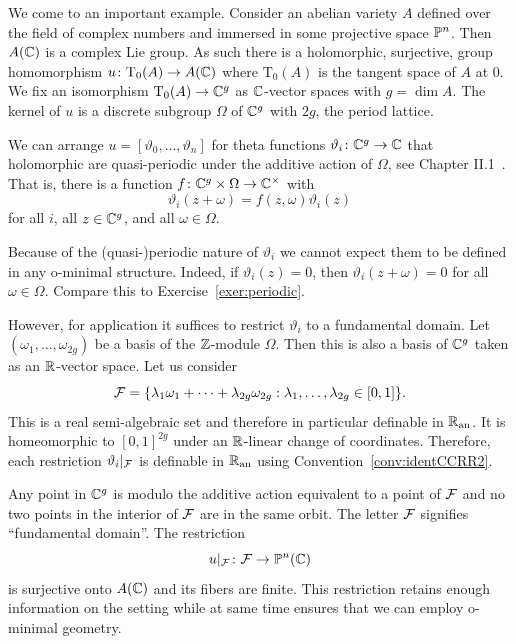 \begin{example}
  \label{ex:thetafunc}
  We come to an important example. Consider an abelian variety $A$
  defined over the field of complex numbers and immersed in some
  projective space ${\mathbb{P}}^n$.
  Then $A({\mathbb{C}})$ is a complex Lie group. As such there is a
  holomorphic, surjective, group homomorphism
  $u\colon \mathrm{T}_0(A) \rightarrow
  A({\mathbb{C}})$
  where $\mathrm{T}_0(A)$ is the tangent space of $A$ at $0$.
  We fix an isomorphism $\mathrm{T}_0(A)\rightarrow{\mathbb{C}}^g$ as
  ${\mathbb{C}}$-vector spaces with $g=\dim A$. The kernel of $u$ is a discrete
  subgroup $\Omega$ of ${\mathbb{C}}^g$ with  $2g$, the period lattice.

  We can arrange $u = [\vartheta_0,\ldots,\vartheta_n]$ for theta
  functions $\vartheta_i \colon {\mathbb{C}}^g \rightarrow{\mathbb{C}}$ that holomorphic
  are quasi-periodic  under the additive action of $\Omega$, see
  Chapter II.1~\cite{MumfordTataLectures}.
  That is, there is a function $f\colon {\mathbb{C}}^g\times \Omega\rightarrow
  {\mathbb{C}}^\times$ with 
  \begin{equation}
    \label{eq:thetatransf}
    \vartheta_i(z+\omega) = f(z,\omega) \vartheta_i(z)
  \end{equation}
  for all $i$, all $z\in{\mathbb{C}}^g$, and all $\omega\in\Omega$. 
  
  Because of the (quasi-)periodic nature of $\vartheta_i$ we cannot
  expect them to be defined in any o-minimal structure. Indeed, if
  $\vartheta_i(z)=0$, then $\vartheta_i(z+\omega)=0$ for all
  $\omega\in\Omega$. Compare this to Exercise~\ref{exer:periodic}.
  
  However, for application it suffices to restrict $\vartheta_i$ to a
  fundamental domain. 
  Let $(\omega_1,\ldots,\omega_{2g})$ be a basis of the ${\mathbb{Z}}$-module
  $\Omega$. Then this is also a basis of ${\mathbb{C}}^{g}$ taken as an
  ${\mathbb{R}}$-vector space. Let us consider
  \begin{equation}
    \label{eq:fdav}
    {\mathcal F} = \{\lambda_1\omega_1+\cdots+\lambda_{2g}\omega_{2g} :
  \lambda_1,\ldots,\lambda_{2g}\in [0,1]\}.
  \end{equation}
  This is a real semi-algebraic set and therefore in particular definable
  in ${{\mathbb{R}}_{\mathrm{an}}}$. It is homeomorphic to $[0,1]^{2g}$
  under an ${\mathbb{R}}$-linear change of coordinates.
  Therefore, each restriction $\vartheta_i|_{{\mathcal F}}$ is definable in ${{\mathbb{R}}_{\mathrm{an}}}$ using
  Convention~\ref{conv:identCCRR2}. 
  
  Any point in ${\mathbb{C}}^g$ is modulo the additive action
  equivalent to a point of ${\mathcal F}$ and no two points in the interior of ${\mathcal F}$
  are in the same orbit. The letter ${\mathcal F}$ signifies ``fundamental
  domain''. 
  The restriction
  \begin{equation*}
    u|_{{\mathcal F}} \colon {\mathcal F}\rightarrow {\mathbb{P}}^n({\mathbb{C}})
  \end{equation*}
  is surjective onto $A({\mathbb{C}})$ and its fibers are finite.
  This restriction retains enough information on the setting while at
  same time
  ensures that we can employ o-minimal geometry. 


\end{example}
